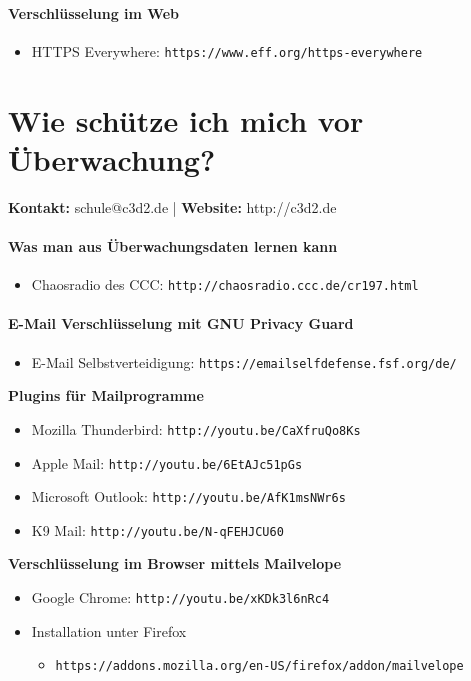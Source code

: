 \documentclass[a5paper]{scrartcl}
\begin{document}
\subsection*{Verschlüsselung im Web}
\begin{itemize}
  \item HTTPS Everywhere: \texttt{https://www.eff.org/https-everywhere}
\end{itemize}
\pagebreak
\part*{Wie schütze ich mich vor Überwachung?}
\textbf{Kontakt:} schule@c3d2.de | \textbf{Website:} http://c3d2.de
\vspace{2mm}

\subsection*{Was man aus Überwachungsdaten lernen kann}
\begin{itemize}
    \item Chaosradio des CCC: \texttt{http://chaosradio.ccc.de/cr197.html}
\end{itemize}

\subsection*{E-Mail Verschlüsselung mit GNU Privacy Guard}
\begin{itemize}
    \item E-Mail Selbstverteidigung: \texttt{https://emailselfdefense.fsf.org/de/}
\end{itemize}
\textbf{Plugins für Mailprogramme}
\begin{itemize}
   \item Mozilla Thunderbird: \texttt{http://youtu.be/CaXfruQo8Ks}
   \item Apple Mail: \texttt{http://youtu.be/6EtAJc51pGs}  
   \item Microsoft Outlook: \texttt{http://youtu.be/AfK1msNWr6s} 
   \item K9 Mail: \texttt{http://youtu.be/N-qFEHJCU60} 
\end{itemize}
\textbf{Verschlüsselung im Browser mittels Mailvelope}
\begin{itemize}
   \item Google Chrome: \texttt{http://youtu.be/xKDk3l6nRc4}
   \item Installation unter Firefox
      \begin{itemize}
         \item[] \footnotesize{\texttt{https://addons.mozilla.org/en-US/firefox/addon/mailvelope}} 
      \end{itemize}
\end{itemize}
\end{document}

